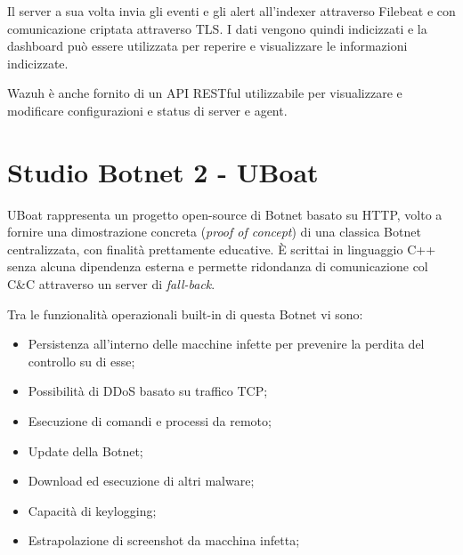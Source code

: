 Il server a sua volta invia gli eventi e gli alert all'indexer attraverso Filebeat e con comunicazione criptata attraverso TLS.
I dati vengono quindi indicizzati e la dashboard può essere utilizzata per reperire e visualizzare le informazioni indicizzate.

Wazuh è anche fornito di un API RESTful utilizzabile per visualizzare e modificare configurazioni e status di server e agent.




\chapter{Studio Botnet 2 - UBoat}




UBoat \cite{uboat} rappresenta un progetto open-source di Botnet basato su HTTP, volto a fornire una dimostrazione concreta (\textit{proof of concept}) di una classica Botnet centralizzata, con finalità prettamente educative. È scrittai in linguaggio C++ senza alcuna dipendenza esterna e permette ridondanza di comunicazione col C\&C attraverso un server di \textit{fall-back}.

Tra le funzionalità operazionali built-in  di questa Botnet vi sono:
\begin{itemize}
    \item Persistenza all'interno delle macchine infette per prevenire la perdita del controllo su di esse;
    \item Possibilità di DDoS basato su traffico TCP;
    \item Esecuzione di comandi e  processi da remoto;
    \item Update della Botnet;
    \item Download ed esecuzione di altri malware;
    \item Capacità di keylogging;
    \item Estrapolazione di screenshot da macchina infetta;
\end{itemize}

